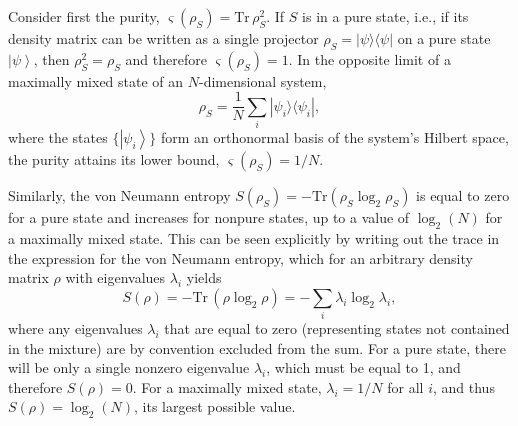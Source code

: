 \documentclass[3p,sort&compress,12pt]{elsarticle}
\newcommand{\ket}[1]{\left\vert{#1}\right\rangle}
\newcommand{\ketbra}[2]{\ensuremath{|{#1 \rangle}{\langle #2}|}}
\newcommand{\op}[1]{#1}
\begin{document}
Consider first the purity, $\varsigma(\op{\rho}_S) = \text{Tr} \,\op{\rho}_S^2$. If $S$ is in a pure state, i.e., if its density matrix can be written as a single projector $\op{\rho}_S=\ketbra{\psi}{\psi}$ on a pure state $\ket{\psi}$, then $\op{\rho}_S^2=\op{\rho}_S$ and therefore $\varsigma(\op{\op{\rho}}_S) =1$. In the opposite limit of a maximally mixed state of an $N$-dimensional system,
%
\begin{equation}
\label{eq:msd}
  \op{\rho}_S = \frac{1}{N} \sum_{i}  \ketbra{\psi_i}{\psi_i},
\end{equation}
%
where the states $\{\ket{\psi_i}\}$ form an orthonormal basis of the system's Hilbert space, the purity attains its lower bound, $\varsigma(\op{\rho}_S) =1/N$. 

Similarly, the von Neumann entropy $S(\op{\rho}_S) = - \text{Tr}\left( \op{\rho}_S \log_2 \op{\rho}_S \right)$ is equal to zero for a pure state and increases for nonpure states, up to a value of $\log_2 (N)$ for a maximally mixed state. This can be seen explicitly by writing out the trace in the expression for the von Neumann entropy, which for an arbitrary density matrix $\op{\rho}$ with eigenvalues $\lambda_i$ yields
%
\begin{equation}\label{eq:ojibef00011}
  S(\op{\rho}) = - \text{Tr} \, ( \op{\rho} \log_2 \op{\rho} ) =
  - \sum_i \lambda_i \log_2 \lambda_i,
\end{equation}
%
where any eigenvalues $\lambda_i$ that are equal to zero (representing states not contained in the mixture) are by convention excluded from the sum. For a pure state, there will be only a single nonzero eigenvalue $\lambda_i$, which must be equal to 1, and therefore $S(\op{\rho}) = 0$. For a maximally mixed state, $\lambda_i=1/N$ for all $i$, and thus $S(\op{\rho}) = \log_2 (N)$, its largest possible value. 
\end{document}
